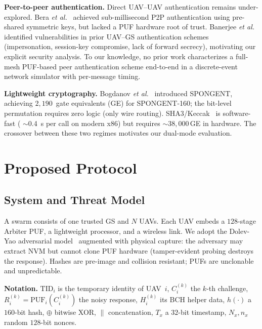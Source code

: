 \documentclass[conference,a4paper,10pt]{IEEEtran}
\begin{document}
\textbf{Peer-to-peer authentication.}
Direct UAV--UAV authentication remains under-explored. Bera \textit{et
al.}~\cite{peer2peer_auth} achieved sub-millisecond P2P
authentication using pre-shared symmetric keys, but lacked a PUF
hardware root of trust. Banerjee \textit{et
al.}~\cite{puf_uav_security_analysis} identified vulnerabilities in
prior UAV--GS authentication schemes (impersonation, session-key
compromise, lack of forward secrecy), motivating our explicit
security analysis. To our knowledge, no prior work characterizes a
full-mesh PUF-based peer authentication scheme end-to-end in a
discrete-event network simulator with per-message timing.

\textbf{Lightweight cryptography.}
Bogdanov \textit{et al.}~\cite{spongent_original} introduced SPONGENT,
achieving $2{,}190$~gate equivalents (GE) for SPONGENT-160; the
bit-level permutation requires zero logic (only wire routing).
SHA3/Keccak~\cite{sha3_standard, keccak_team} is software-fast (
$\sim$0.4~\textmu s per call on modern x86) but requires $\sim
38{,}000$\,GE in hardware. The crossover between these two regimes
motivates our dual-mode evaluation.


\section{Proposed Protocol}
\label{sec:protocol}

\subsection{System and Threat Model}
A swarm consists of one trusted GS and $N$ UAVs. Each UAV embeds a
$128$-stage Arbiter PUF, a lightweight processor, and a wireless link.
We adopt the Dolev-Yao adversarial model~\cite{dolev_yao} augmented
with physical capture: the adversary may extract NVM but cannot clone
PUF hardware (tamper-evident probing destroys the response). Hashes
are pre-image and collision resistant; PUFs are unclonable and
unpredictable.

\textbf{Notation.} $\mathrm{TID}_i$ is the temporary identity of
UAV~$i$, $C_i^{(k)}$ the $k$-th challenge,
$R_i^{(k)}=\mathrm{PUF}_i(C_i^{(k)})$ the noisy response,
$H_i^{(k)}$ its BCH helper data, $h(\cdot)$ a $160$-bit hash,
$\oplus$ bitwise XOR, $\|$ concatenation, $T_x$ a $32$-bit timestamp,
$N_x, n_x$ random $128$-bit nonces.
\end{document}
